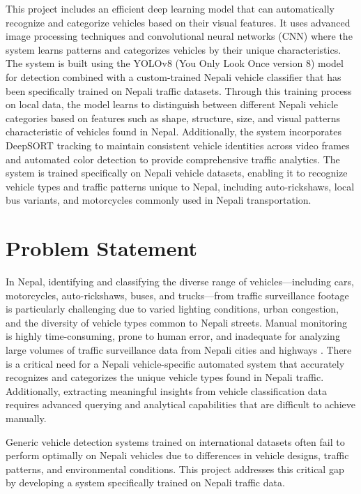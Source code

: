 \documentclass[12pt,a4paper]{report}
\begin{document}
This project includes an efficient deep learning model that can automatically recognize and categorize vehicles based on their visual features. It uses advanced image processing techniques and convolutional neural networks (CNN) \cite{krizhevsky2012imagenet} where the system learns patterns and categorizes vehicles by their unique characteristics. The system is built using the YOLOv8 (You Only Look Once version 8) model \cite{redmon2016yolo, ultralytics2023yolov8} for detection combined with a custom-trained Nepali vehicle classifier that has been specifically trained on Nepali traffic datasets. Through this training process on local data, the model learns to distinguish between different Nepali vehicle categories based on features such as shape, structure, size, and visual patterns characteristic of vehicles found in Nepal. Additionally, the system incorporates DeepSORT tracking \cite{bewley2016deepsort} to maintain consistent vehicle identities across video frames and automated color detection to provide comprehensive traffic analytics. The system is trained specifically on Nepali vehicle datasets, enabling it to recognize vehicle types and traffic patterns unique to Nepal, including auto-rickshaws, local bus variants, and motorcycles commonly used in Nepali transportation.

\section{Problem Statement}

In Nepal, identifying and classifying the diverse range of vehicles—including cars, motorcycles, auto-rickshaws, buses, and trucks—from traffic surveillance footage is particularly challenging due to varied lighting conditions, urban congestion, and the diversity of vehicle types common to Nepali streets. Manual monitoring is highly time-consuming, prone to human error, and inadequate for analyzing large volumes of traffic surveillance data from Nepali cities and highways \cite{tak2021development}. There is a critical need for a Nepali vehicle-specific automated system that accurately recognizes and categorizes the unique vehicle types found in Nepali traffic. Additionally, extracting meaningful insights from vehicle classification data requires advanced querying and analytical capabilities that are difficult to achieve manually.

Generic vehicle detection systems trained on international datasets often fail to perform optimally on Nepali vehicles due to differences in vehicle designs, traffic patterns, and environmental conditions. This project addresses this critical gap by developing a system specifically trained on Nepali traffic data.
\end{document}
